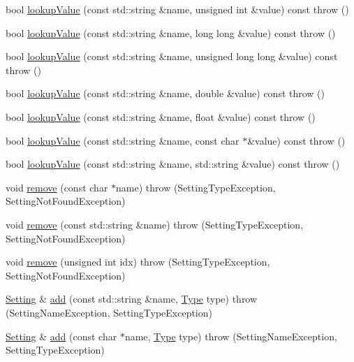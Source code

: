 \begin{DoxyCompactItemize}
\item 
bool \hyperlink{classlibconfig_1_1_setting_af248d3e213e6c5eb7460cc68c2c8ceb1}{lookupValue} (const std::string \&name, unsigned int \&value) const   throw ()
\item 
bool \hyperlink{classlibconfig_1_1_setting_a8ac7d72676892a0d77512f00a4d7425b}{lookupValue} (const std::string \&name, long long \&value) const   throw ()
\item 
bool \hyperlink{classlibconfig_1_1_setting_a38834bf96527b5de10a7b35887600f7e}{lookupValue} (const std::string \&name, unsigned long long \&value) const   throw ()
\item 
bool \hyperlink{classlibconfig_1_1_setting_a6f1d2d46c121d2d715f6001b35d7a0ea}{lookupValue} (const std::string \&name, double \&value) const   throw ()
\item 
bool \hyperlink{classlibconfig_1_1_setting_af8a2c987e4b3f277a77b59e1763ddc7b}{lookupValue} (const std::string \&name, float \&value) const   throw ()
\item 
bool \hyperlink{classlibconfig_1_1_setting_a59603d8123101a3c226b31995693876f}{lookupValue} (const std::string \&name, const char $\ast$\&value) const   throw ()
\item 
bool \hyperlink{classlibconfig_1_1_setting_a6d4ee07dc366531b9d47e35a84321f2f}{lookupValue} (const std::string \&name, std::string \&value) const   throw ()
\item 
void \hyperlink{classlibconfig_1_1_setting_a52f173e9d7abd9d3e8e0ba4151ed89d1}{remove} (const char $\ast$name)  throw (SettingTypeException, SettingNotFoundException)
\item 
void \hyperlink{classlibconfig_1_1_setting_a577708b2a0164024ea88894626b3f24b}{remove} (const std::string \&name)  throw (SettingTypeException, SettingNotFoundException)
\item 
void \hyperlink{classlibconfig_1_1_setting_abc80ebd07bbca2cc65b37b74a452104a}{remove} (unsigned int idx)  throw (SettingTypeException, SettingNotFoundException)
\item 
\hyperlink{classlibconfig_1_1_setting}{Setting} \& \hyperlink{classlibconfig_1_1_setting_ae1860aa1886a488b33da41da33f334f5}{add} (const std::string \&name, \hyperlink{classlibconfig_1_1_setting_a42f760ff88654e784477a6f040267bb4}{Type} type)  throw (SettingNameException, SettingTypeException)
\item 
\hyperlink{classlibconfig_1_1_setting}{Setting} \& \hyperlink{classlibconfig_1_1_setting_a3b3ad21872906e8533c711cfc73b50dd}{add} (const char $\ast$name, \hyperlink{classlibconfig_1_1_setting_a42f760ff88654e784477a6f040267bb4}{Type} type)  throw (SettingNameException, SettingTypeException)

\end{DoxyCompactItemize}
